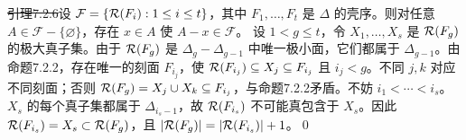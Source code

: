 \st{引理7.2.6}设 $\mathcal F=\{\mathcal R(F_i):1\le i\le t\}$，其中 $F_1,\ldots,F_t$ 是 $\Delta$ 的壳序。则对任意 $A\in\mathcal F-\{\varnothing\}$，存在 $x\in A$ 使 $A-x\in\mathcal F$。
\pr 设 $1<g\le t$，令 $X_1,\ldots,X_s$ 是 $\mathcal R(F_g)$ 的极大真子集。由于 $\mathcal R(F_g)$ 是 $\Delta_g-\Delta_{g-1}$ 中唯一极小面，它们都属于 $\Delta_{g-1}$。由命题7.2.2，存在唯一的刻面 $F_{i_j}$，使 $\mathcal R(F_{i_j})\subseteq X_j\subseteq F_{i_j}$ 且 $i_j<g$。不同 $j,k$ 对应不同刻面；否则 $\mathcal R(F_g)=X_j\cup X_k\subseteq F_{i_j}$，与命题7.2.2矛盾。不妨 $i_1<\cdots<i_s$。$X_s$ 的每个真子集都属于 $\Delta_{i_s-1}$，故 $\mathcal R(F_{i_s})$ 不可能真包含于 $X_s$。因此 $\mathcal R(F_{i_s})=X_s\subset\mathcal R(F_g)$，且 $|\mathcal R(F_g)|=|\mathcal R(F_{i_s})|+1$。\qed
